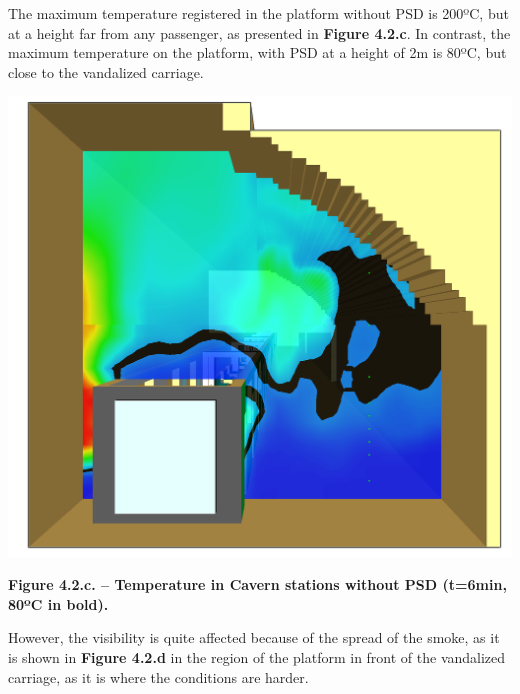 \documentclass{article}
\begin{document}
\noindent{}The maximum temperature registered in the platform without PSD is 200ºC, but 
at a height far from any passenger, as presented in \textbf{Figure 4.2.c}. In contrast, 
the maximum temperature on the platform, with PSD at a height of 2m is 80ºC, 
but close to the vandalized carriage.%

\begin{mdcenter}%

\noindent{}\includegraphics[keepaspectratio=true,width=\dimmin{}{\dimwidth{0.45}}]{images/Fig-4.2.c}{}%
\end{mdcenter}%

\begin{mdcenter}%

\noindent{}\textbf{Figure 4.2.c. – Temperature in Cavern stations without PSD (t=6min, 80ºC in bold).}%
\end{mdcenter}%

\noindent{}However, the visibility is quite affected because of the spread of the smoke, as 
it is shown in \textbf{Figure 4.2.d} in the region of the platform in front of the vandalized 
carriage, as it is where the conditions are harder.%
\end{document}
